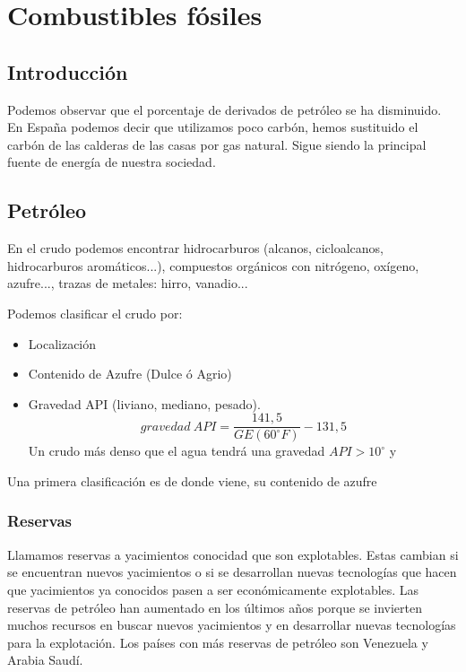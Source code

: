 \chapter{Combustibles fósiles}
\section{Introducción}

Podemos observar que el porcentaje de derivados de petróleo se ha disminuido. En España podemos decir que utilizamos poco carbón, hemos sustituido el carbón de las calderas de las casas por gas natural. Sigue siendo la principal fuente de energía de nuestra sociedad.

\section{Petróleo}

En el crudo podemos encontrar hidrocarburos (alcanos, cicloalcanos, hidrocarburos aromáticos...), compuestos orgánicos con nitrógeno, oxígeno, azufre..., trazas de metales: hirro, vanadio...

Podemos clasificar el crudo por:
\begin{itemize}
    \item Localización
    \item Contenido de Azufre (Dulce ó Agrio)
    \item Gravedad API (liviano, mediano, pesado).
    \begin{equation}
        gravedad\ API = \frac{141,5}{GE(60^\circ F)} - 131,5 
    \end{equation}
    Un crudo más denso que el agua tendrá una gravedad $API > 10 ^\circ$ y 
\end{itemize}

Una primera clasificación es de donde viene, su contenido de azufre

\subsection{Reservas}

Llamamos reservas a yacimientos conocidad que son explotables. Estas cambian si se encuentran nuevos yacimientos o si se desarrollan nuevas tecnologías que hacen que yacimientos ya conocidos pasen a ser económicamente explotables. Las reservas de petróleo han aumentado en los últimos años porque se invierten muchos recursos en buscar nuevos yacimientos y en desarrollar nuevas tecnologías para la explotación. Los países con más reservas de petróleo son Venezuela y Arabia Saudí. 

